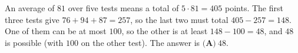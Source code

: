 An average of $81$ over five tests means a total of $5\cdot81=405$ points. The first three tests give $76+94+87=257$, so the last two must total $405-257=148$. One of them can be at most $100$, so the other is at least $148-100=48$, and $48$ is possible (with $100$ on the other test). The answer is $\boxed{\textbf{(A)}\ 48}$.
